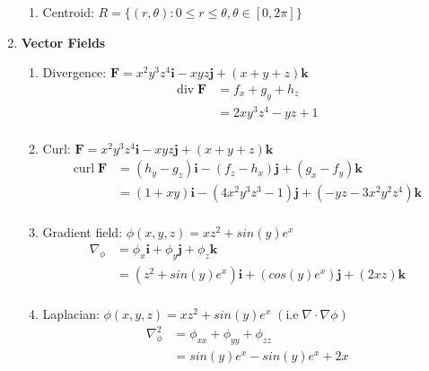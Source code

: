 \documentclass[11pt]{article}
\begin{document}
\begin{preview}
\begin{enumerate}
\begin{enumerate}
            \item Centroid: $R = \{ (r, \theta) : 0 \le r \le \theta, \theta \in [0, 2\pi] \}$
          \end{enumerate}
    \item \textbf{Vector Fields}
          \begin{enumerate}
            \item Divergence: $\textbf{F}=x^{2}y^{3}z^{4}\textbf{i} - xyz\textbf{j} + (x+y+z)\textbf{k}$
                  \begin{align*}
                    \mathrm{div} \; \textbf{F} & = f_{x} + g_{y} + h_{z} \\
                                               & = 2xy^{3}z^{4} -yz + 1  \\
                  \end{align*}
            \item Curl: $\textbf{F}=x^{2}y^{3}z^{4}\textbf{i} - xyz\textbf{j} + (x+y+z)\textbf{k}$
                  \begin{align*}
                    \mathrm{curl} \; \textbf{F} & = (h_y - g_z)\textbf{i} - (f_z - h_x)\textbf{j} + (g_x - f_y)\textbf{k}                      \\
                                                & = (1 + xy)\textbf{i} - (4x^{2}y^{3}z^{3} - 1)\textbf{j} + (-yz - 3x^{2}y^{2}z^{4})\textbf{k} \\
                  \end{align*}
            \item Gradient field: $\phi(x,y,z)=xz^{2}+sin(y)e^{x}$
                  \begin{align*}
                    \nabla_{\phi} & = \phi_{x}\textbf{i} + \phi_{y}\textbf{j} + \phi_{z}\textbf{k}                                                     \\
                                  & =  \left(z^{2} + sin(y)e^{x}\right) \textbf{i} + \left(cos(y)e^{x}\right) \textbf{j} + \left(2xz\right) \textbf{k} \\
                  \end{align*}
            \item Laplacian: $\phi(x,y,z)=xz^{2}+sin(y)e^{x} \; (\mathrm{i.e} \; \nabla{\cdot}\nabla\phi)$
                  \begin{align*}
                    \nabla_{\phi}^{2} & =  \phi_{xx} + \phi_{yy} + \phi_{zz} \\
                                      & =  sin(y)e^{x} - sin(y)e^{x} + 2x    \\

\end{align*}
\end{enumerate}
\end{enumerate}
\end{preview}
\end{document}
